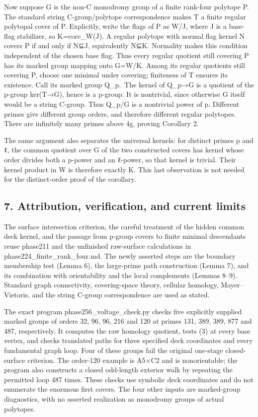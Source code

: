 \documentclass[
  11pt,
  a4paper,
]{article}
\begin{document}
Now suppose G is the non-C monodromy group of a finite rank-four
polytope P. The standard string C-group/polytope correspondence makes T
a finite regular polytopal cover of P. Explicitly, write the flags of P
as W/J, where J is a base-flag stabilizer, so K=core\_W(J). A regular
polytope with normal flag kernel N covers P if and only if N⊆J,
equivalently N⊆K. Normality makes this condition independent of the
chosen base flag. Thus every regular quotient still covering P has its
marked group mapping onto G=W/K. Among its regular quotients still
covering P, choose one minimal under covering; finiteness of T ensures
its existence. Call its marked group Q\_p.~The kernel of Q\_p→G is a
quotient of the p-group ker(T→G), hence is a p-group. It is nontrivial,
since otherwise G itself would be a string C-group. Thus
\textbar Q\_p\textbar/\textbar G\textbar{} is a nontrivial power of p.
Different primes give different group orders, and therefore different
regular polytopes. There are infinitely many primes above 4g, proving
Corollary 2.

The same argument also separates the universal kernels: for distinct
primes p and ℓ, the common quotient over G of the two constructed covers
has kernel whose order divides both a p-power and an ℓ-power, so that
kernel is trivial. Their kernel product in W is therefore exactly K.
This last observation is not needed for the distinct-order proof of the
corollary.

\subsection{7. Attribution, verification, and current
limits}\label{attribution-verification-and-current-limits}

The surface intersection criterion, the careful treatment of the hidden
common deck kernel, and the passage from p-group covers to finite
minimal descendants reuse phase211 and the unfinished raw-surface
calculations in phase224\_finite\_rank\_four.md. The newly asserted
steps are the boundary membership test (Lemma 6), the large-prime path
construction (Lemma 7), and its combination with orientability and the
local complements (Lemmas 8--9). Standard graph connectivity,
covering-space theory, cellular homology, Mayer--Vietoris, and the
string C-group correspondence are used as stated.

The exact program phase256\_voltage\_check.py checks five explicitly
supplied marked groups of orders 32, 96, 96, 216 and 120 at primes 131,
389, 389, 877 and 487, respectively. It computes the raw homology
quotient, tests (3) at every base vertex, and checks translated paths
for three specified deck coordinates and every fundamental graph loop.
Four of these groups fail the original one-stage closed-surface
criterion. The order-120 example is A5×C2 and is nonorientable; the
program also constructs a closed odd-length exterior walk by repeating
the permitted loop 487 times. These checks use symbolic deck coordinates
and do not enumerate the enormous first covers. The four other inputs
are marked-group diagnostics, with no asserted realization as monodromy
groups of actual polytopes.
\end{document}
